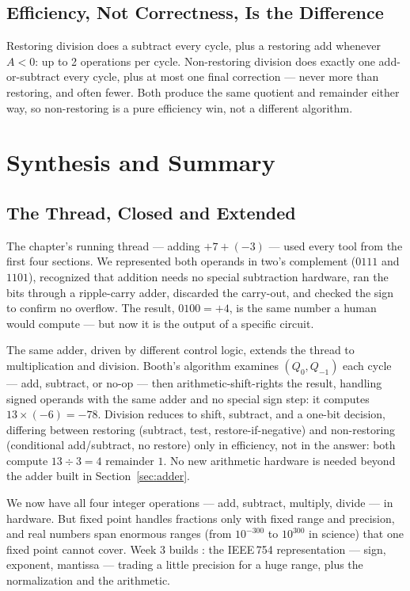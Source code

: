 \documentclass[11pt]{article}
\begin{document}
\subsection{Efficiency, Not Correctness, Is the Difference}

Restoring division does a subtract every cycle, plus a restoring add whenever $A<0$: up to 2 operations per cycle. Non-restoring division does exactly one add-or-subtract every cycle, plus at most one final correction --- never more than restoring, and often fewer. Both produce the same quotient and remainder either way, so non-restoring is a pure efficiency win, not a different algorithm.

\section{Synthesis and Summary}
\label{sec:synthesis}

\subsection{The Thread, Closed and Extended}

The chapter's running thread --- adding $+7 + (-3)$ --- used every tool from the first four sections. We represented both operands in two's complement ($0111$ and $1101$), recognized that addition needs no special subtraction hardware, ran the bits through a ripple-carry adder, discarded the carry-out, and checked the sign to confirm no overflow. The result, $0100 = +4$, is the same number a human would compute --- but now it is the output of a specific circuit.

The same adder, driven by different control logic, extends the thread to multiplication and division. Booth's algorithm examines $(Q_0,Q_{-1})$ each cycle --- add, subtract, or no-op --- then arithmetic-shift-rights the result, handling signed operands with the same adder and no special sign step: it computes $13\times(-6)=-78$. Division reduces to shift, subtract, and a one-bit decision, differing between restoring (subtract, test, restore-if-negative) and non-restoring (conditional add/subtract, no restore) only in efficiency, not in the answer: both compute $13\div3 = 4$ remainder $1$. No new arithmetic hardware is needed beyond the adder built in Section~\ref{sec:adder}.

We now have all four integer operations --- add, subtract, multiply, divide --- in hardware. But fixed point handles fractions only with fixed range and precision, and real numbers span enormous ranges (from $10^{-300}$ to $10^{300}$ in science) that one fixed point cannot cover. Week 3 builds : the IEEE\,754 representation --- sign, exponent, mantissa --- trading a little precision for a huge range, plus the normalization and the arithmetic.
\end{document}
